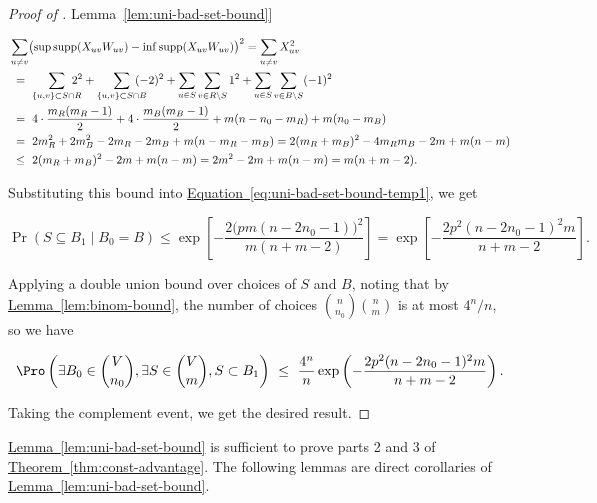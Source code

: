 \documentclass[11pt]{article}
\numberwithin{equation}{section}
\theoremstyle{definition}
\theoremstyle{plain}
\newcommand{\expref}[2]{\hyperref[#2]{#1~\ref{#2}}}
\newcommand{\expeqref}[2]{\hyperref[#2]{#1~\eqref{#2}}}
\begin{document}
\begin{proof}[Proof of \expref{Lemma}{lem:uni-bad-set-bound}]
\begin{linenomath}
\begin{equation*}
						\begin{aligned}
							& \sum_{u\neq v} \bigl(\sup \text{supp}(X_{uv}W_{uv})
							- \inf \text{supp}(X_{uv}W_{uv})\bigr)^2
							= \sum_{u\neq v} X_{uv}^2 \\
							& \ = \ \sum_{\{u, v\} \subset S\cap R}\hspace{-1em}2^2
							+ \sum_{\{u, v\} \subset S\cap B}\hspace{-1em}(-2)^2
							+ \sum_{u\in S} \sum_{v\in R\setminus S}1^2
							+ \sum_{u\in S} \sum_{v\in B\setminus S}(-1)^2 \\
							& \ = \ 4\cdot\frac{m_R(m_R - 1)}{2} + 4\cdot\frac{m_B(m_B - 1)}{2} + m(n - n_0 - m_R) + m(n_0 - m_B) \\
							& \ = \ 2m_R^2 + 2m_B^2 - 2m_R - 2m_B + m(n - m_R - m_B)
							= 2(m_R + m_B)^2 - 4m_Rm_B - 2m + m(n - m) \\
							& \ \le \ 2(m_R + m_B)^2 - 2m + m(n - m)
							= 2m^2 - 2m + m(n - m) = m(n + m - 2).
						\end{aligned}
				\end{equation*}\end{linenomath}
				Substituting this bound into \expeqref{Equation}{eq:uni-bad-set-bound-temp1}, we get
				\begin{linenomath}\begin{equation*}
						\Pr(S\subseteq B_1\mid B_0 = B)
						\le \exp\left[-\frac{2\bigl(pm(n - 2n_0 - 1)\bigr)^2}{m(n + m - 2)}\right]
						= \exp\left[-\frac{2p^2(n - 2n_0 - 1)^2m}{n + m - 2}\right].
				\end{equation*}\end{linenomath}
				Applying a double union bound over choices of $S$ and $B$, noting that by \expref{Lemma}{lem:binom-bound}, the number of choices $\binom{n}{n_0}\binom{n}{m}$ is at most $4^n/n$, so we have
				\begin{linenomath}\begin{equation*}
						\Pro \left(\exists B_0\in \binom{V}{n_0}, \exists S\in \binom{V}{m}, S\subset B_1 \right)
						\ \le \ \frac{4^n}{n} \exp\left(-\frac{2p^2(n - 2n_0 - 1)^2m}{n + m - 2} \right).
				\end{equation*}\end{linenomath}
				Taking the complement event, we get the desired result.
			\end{proof}
			
			\expref{Lemma}{lem:uni-bad-set-bound} is sufficient to prove parts 2 and 3 of \expref{Theorem}{thm:const-advantage}.
			The following lemmas are direct corollaries of \expref{Lemma}{lem:uni-bad-set-bound}.
			
\end{document}
